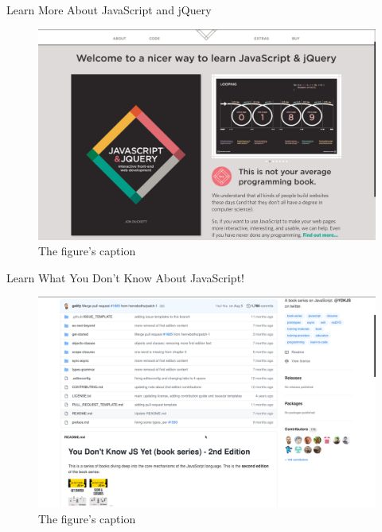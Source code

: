 \documentclass[14pt,aspectratio=169]{beamer}
\begin{document}
%
\begin{frame}{Learn More About JavaScript and jQuery}
  \begin{figure}
    \centering
    \includegraphics[scale=.08]{images/javascript-book.png}
    \caption{The figure's caption}
  \end{figure}
\end{frame}

%
\begin{frame}{Learn What You Don't Know About JavaScript!}
  \begin{figure}
    \centering
    \includegraphics[scale=.08]{images/dont-know-javascript.png}
    \caption{The figure's caption}
  \end{figure}
\end{frame}
\end{document}
